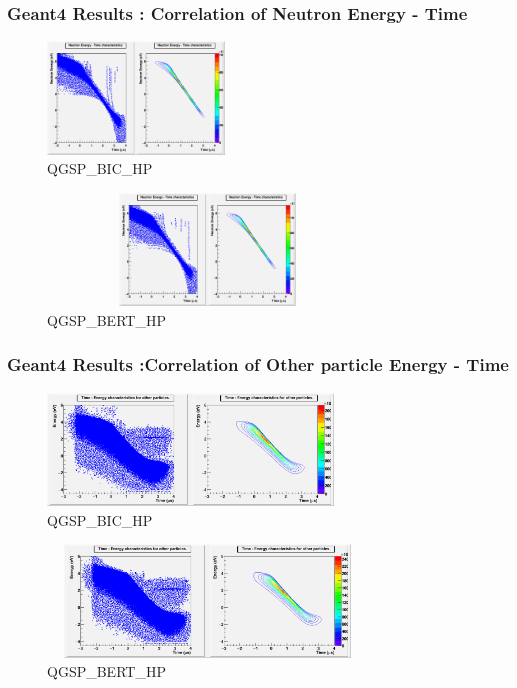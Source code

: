 \documentclass{beamer}
\begin{document}
    \begin{frame}
    \frametitle{Geant4 Results : Correlation of Neutron Energy - Time}
    \vskip -2mm
    \begin{figure}
    \includegraphics [height=30mm, width=85 mm] {PICS/NeutEnergyTimeBIC.png}
    \caption{\tiny QGSP\_BIC\_HP}
    \end{figure}
    \vskip -7mm
    \begin{figure}
    \includegraphics [height=30mm, width=85mm] {PICS/NeutEnergyTimeBERT.png}
    \caption{\tiny QGSP\_BERT\_HP}
    \end{figure}
    \end{frame}

    \begin{frame}
    \frametitle{Geant4 Results :Correlation of Other particle Energy - Time}
    \vskip -2mm
    \begin{figure}
    \includegraphics [height=30mm, width=85 mm] {PICS/OtherEnergyTimeBIC.png}
    \caption{\tiny QGSP\_BIC\_HP}
    \end{figure}
    \vskip -7mm        
    \begin{figure}
    \includegraphics [height=30mm, width=85mm] {PICS/OtherEnergyTimeBERT.png}
    \caption{\tiny QGSP\_BERT\_HP}
    \end{figure}
    \end{frame}
\end{document}
